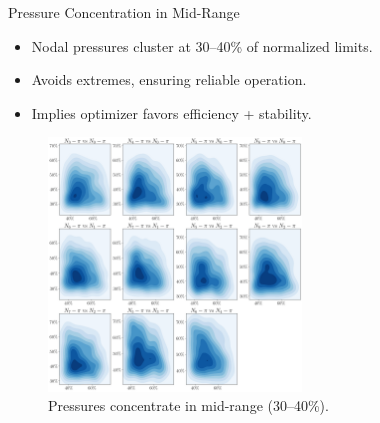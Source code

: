 \documentclass[hyperref={colorlinks,citecolor=blue,linkcolor=blue,urlcolor=blue}]{beamer}
\begin{document}
\begin{frame}{Pressure Concentration in Mid-Range}
    \begin{itemize}
        \item Nodal pressures cluster at 30--40\% of normalized limits.
        \item Avoids extremes, ensuring reliable operation.
        \item Implies optimizer favors efficiency + stability.
    \end{itemize}
    \begin{figure}
        \includegraphics[width=0.6\textwidth]{figures/outputs_outputs_3.png}
        \caption*{Pressures concentrate in mid-range (30--40\%).}
    \end{figure}
\end{frame}
\end{document}
